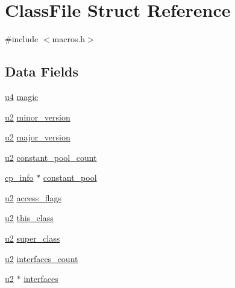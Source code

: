 \hypertarget{struct_class_file}{}\section{Class\+File Struct Reference}
\label{struct_class_file}


{\ttfamily \#include $<$macros.\+h$>$}

\subsection*{Data Fields}
\begin{DoxyCompactItemize}
\item 
\hyperlink{macros_8h_ae5be1f726785414dd1b77d60df074c9d}{u4} \hyperlink{struct_class_file_a9c187266c328a40ddc2dde8c8a230a65}{magic}
\item 
\hyperlink{macros_8h_a732cde1300aafb73b0ea6c2558a7a54f}{u2} \hyperlink{struct_class_file_ad0028839ce12090266cbdc5df1046062}{minor\+\_\+version}
\item 
\hyperlink{macros_8h_a732cde1300aafb73b0ea6c2558a7a54f}{u2} \hyperlink{struct_class_file_a5a3ef20c14bd517fca3fa5841846ab4b}{major\+\_\+version}
\item 
\hyperlink{macros_8h_a732cde1300aafb73b0ea6c2558a7a54f}{u2} \hyperlink{struct_class_file_a0d64ff67928a39e52a75c972b5f5697a}{constant\+\_\+pool\+\_\+count}
\item 
\hyperlink{structcp__info}{cp\+\_\+info} $\ast$ \hyperlink{struct_class_file_ace3229f6e4d460d20e72e493d180ecc5}{constant\+\_\+pool}
\item 
\hyperlink{macros_8h_a732cde1300aafb73b0ea6c2558a7a54f}{u2} \hyperlink{struct_class_file_a4cc32d48303aeaaaaea05bf77abdec59}{access\+\_\+flags}
\item 
\hyperlink{macros_8h_a732cde1300aafb73b0ea6c2558a7a54f}{u2} \hyperlink{struct_class_file_afd1a9f5d893befc9ea66f915fd6fa039}{this\+\_\+class}
\item 
\hyperlink{macros_8h_a732cde1300aafb73b0ea6c2558a7a54f}{u2} \hyperlink{struct_class_file_a85a7fa4c7fd5d455b77e525d952f440f}{super\+\_\+class}
\item 
\hyperlink{macros_8h_a732cde1300aafb73b0ea6c2558a7a54f}{u2} \hyperlink{struct_class_file_a5d766202b705d1bdb025a0e7fff8953c}{interfaces\+\_\+count}
\item 
\hyperlink{macros_8h_a732cde1300aafb73b0ea6c2558a7a54f}{u2} $\ast$ \hyperlink{struct_class_file_a31608612612ea019eef47ae5d656dc23}{interfaces}
\item 

\end{DoxyCompactItemize}
